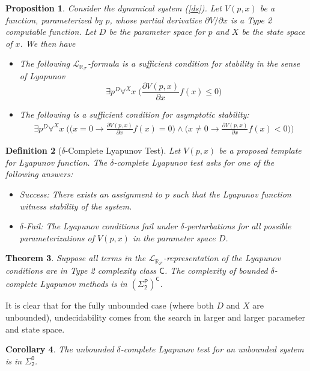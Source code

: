 \documentclass[10pt]{article}
\theoremstyle{plain}
\newtheorem{theorem}{Theorem}[section]
\newtheorem{proposition}[theorem]{Proposition}
\newtheorem{corollary}[theorem]{Corollary}
\newtheorem{definition}[theorem]{Definition}
\theoremstyle{definition}
\newcommand{\lrf}{\mathcal{L}_{\mathbb{R}_{\mathcal{F}}}}
\begin{document}
\begin{proposition} Consider the dynamical system (\ref{ds}). Let $V(p,x)$ be a function, parameterized by $p$, whose partial derivative ${\partial V}/{\partial x}$ is a Type 2 computable function. Let $D$ be the parameter space for $p$ and $X$ be the state space of $x$. We then have
\begin{itemize}
\item The following $\lrf$-formula is a sufficient condition for stability in the sense of Lyapunov
$$\exists p^D\forall^X x\; \bigg(\frac{\partial V(p,x)}{\partial x}f(x)\leq 0\bigg)$$
\item The following is a sufficient condition for asymptotic stability:
\begin{eqnarray*}
\exists p^D\forall^X x\;\bigg(\Big(x=0\rightarrow\frac{\partial V(p,x)}{\partial x}f(x)= 0\bigg)
\wedge \bigg(x\neq 0 \rightarrow \frac{\partial V(p,x)}{\partial x}f(x)< 0\Big)\bigg)
\end{eqnarray*}
\end{itemize}
\end{proposition}

\begin{definition}[$\delta$-Complete Lyapunov Test]
Let $V(p,x)$ be a proposed template for Lyapunov function. The $\delta$-complete Lyapunov test asks for one of the following answers:
\begin{itemize}
\item {\sf Success}: There exists an assignment to $p$ such that the Lyapunov function witness stability of the system. 
\item {\sf $\delta$-Fail}: The Lyapunov conditions fail under $\delta$-perturbations for all possible parameterizations of $V(p,x)$ in the parameter space $D$.
\end{itemize}
\end{definition}
\begin{theorem}
Suppose all terms in the $\lrf$-representation of the Lyapunov conditions are in Type 2 complexity class $\mathsf{C}$. The complexity of bounded $\delta$-complete Lyapunov methods is in $\mathsf{(\Sigma^P_2)^C}$. 
\end{theorem}

It is clear that for the fully unbounded case (where both $D$ and $X$ are unbounded), undecidability comes from the search in larger and larger parameter and state space. 
\begin{corollary}
The unbounded $\delta$-complete Lyapunov test for an unbounded system is in $\mathsf{\Sigma_2^0}$. 
\end{corollary}
\end{document}
